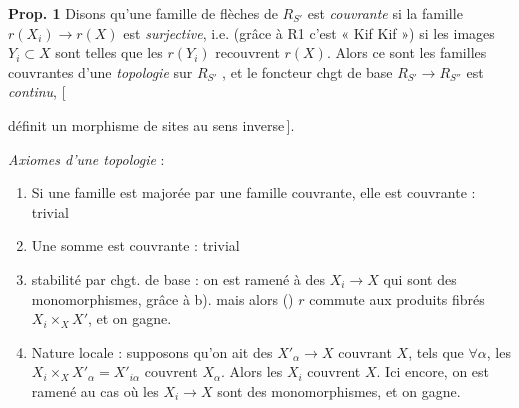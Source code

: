 \documentclass[11pt,a4paper]{article}
\begin{document}
\textbf{Prop. 1}  Disons qu'une famille de flèches  de $R_{S'}$ est
\emph{couvrante} si la famille $r(X_i) \to r(X)$ est \emph{surjective}, i.e.
(grâce à R1 c'est « Kif Kif ») si les images $Y_i \subset X$ sont telles que les
$r(Y_i)$ recouvrent $r(X)$. Alors ce sont les
familles couvrantes d'une \emph{topologie} sur $R_{S'}$ , et le foncteur
chgt de base $R_{S'} \longrightarrow R_{S''}$ est \emph{continu}, [






définit un morphisme de sites au sens inverse\,].

\emph{Axiomes d'une topologie} :
\begin{enumerate}
\item[a)] Si une famille est majorée par une famille couvrante, elle est
couvrante : trivial
\item[b)] Une somme est couvrante : trivial
\item[c)] stabilité par chgt. de base : on est ramené à des $X_i \to X$ qui
sont des monomorphismes, grâce à b). mais alors () $r$ commute aux
produits fibrés $X_i \times_X X'$, et on gagne.
\item[d)] Nature locale : supposons qu'on ait des $X'_{\alpha} \to X$
couvrant $X$, tels que \struck{\ill{}} $\forall \alpha$, les
$X_i \times_X X'_{\alpha} = X'_{i\alpha}$ couvrent $X_{\alpha}$. Alors les
$X_i$ couvrent $X$. Ici encore, on est ramené au cas où les $X_i \to X$ sont
des monomorphismes, et on gagne.
\end{enumerate}
\end{document}
